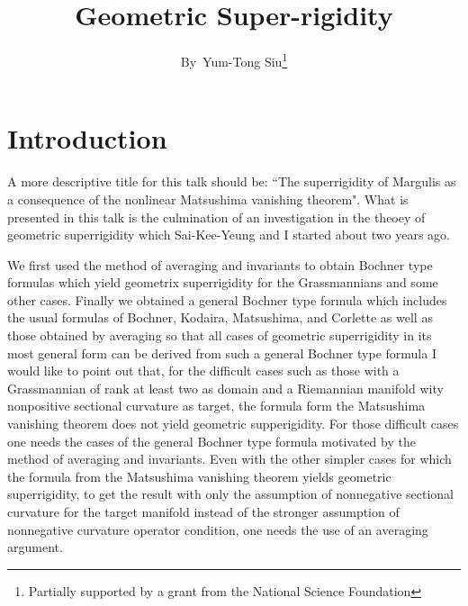 \title{Geometric Super-rigidity}

\author{By~Yum-Tong Siu\footnote{Partially supported by a grant from the National Science Foundation}}


\date{}
\maketitle

\section*{Introduction}

A more descriptive title for this talk should be: ``The superrigidity of Margulis as a consequence of the nonlinear Matsushima vanishing theorem". What is presented in this talk is the culmination of an investigation in the theoey of geometric superrigidity which Sai-Kee-Yeung and I started about two years ago.

We first used the method of averaging and invariants to obtain Bochner type formulas which yield geometrix superrigidity for the Grassmannians and some other cases. Finally we obtained a general Bochner type formula which includes the usual formulas of Bochner, Kodaira, Matsushima, and Corlette as well as those obtained by averaging so that all cases of geometric superrigidity in its most general form can be derived from such a general Bochner type formula I would like to point out that, for the difficult cases such as those with a Grassmannian of rank at least two as domain and a Riemannian manifold wity nonpositive sectional curvature as target, the formula form the Matsushima vanishing theorem does not yield geometric supperigidity. For those difficult cases one needs the cases of the general Bochner type formula motivated by the method of averaging and invariants. Even with the other simpler cases for which the formula from the Matsushima vanishing theorem yields geometric superrigidity, to get the result with only the assumption of nonnegative sectional curvature for the target manifold instead of the stronger assumption of nonnegative curvature operator condition, one needs the use of an averaging argument.


